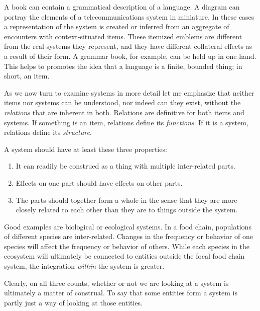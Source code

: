 A book can contain a grammatical description of a language. A diagram 
can portray the elements of a telecommunications system in miniature. In 
these cases a representation of the system is created or inferred 
from an aggregate of encounters with context-situated items. These 
itemized emblems are different from the real systems they 
represent, and they have different collateral effects as a result of 
their form. A grammar book, for example, can be held up in one hand. This helps to promotes the idea that a 
language is a finite, bounded thing; in short, an item. 



As we now turn to examine systems in more detail let me emphasize that neither items nor systems can be understood, nor indeed can 
they exist, without the \textit{relations }that are inherent in both. 
Relations are definitive for both items and systems. If something is an item, 
relations define its \textit{functions}. If it is a system, relations 
define its \textit{structure}.



A system should have at least these three properties: 


\begin{enumerate}
\item It can readily be construed as a thing with multiple inter-related parts.

\item Effects on one part should have effects on other parts.

\item The parts should together form a whole in the sense that they are more closely related to each other than they are to things outside the system. 

\end{enumerate}


Good examples are biological or ecological systems. In a food chain, 
populations of different species are inter-related. Changes in the 
frequency or behavior of one species will affect the frequency or 
behavior of others. While each species in the ecosystem will ultimately 
be connected to entities outside the focal food chain system, the 
integration \textit{within }the system is greater. 



Clearly, on all three counts, whether or not we are looking at a system 
is ultimately a matter of construal. %
To say that some entities form a system is partly just a way of looking at those 
entities. 


